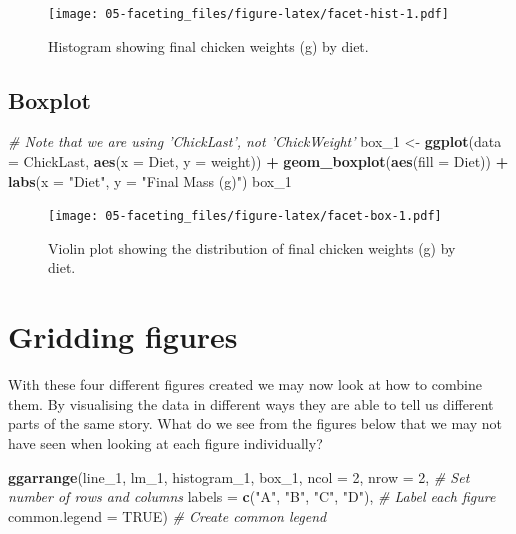 \documentclass[]{book}
\newenvironment{Shaded}{\begin{snugshade}}{\end{snugshade}}
\newcommand{\KeywordTok}[1]{\textcolor[rgb]{0.13,0.29,0.53}{\textbf{#1}}}
\newcommand{\DataTypeTok}[1]{\textcolor[rgb]{0.13,0.29,0.53}{#1}}
\newcommand{\DecValTok}[1]{\textcolor[rgb]{0.00,0.00,0.81}{#1}}
\newcommand{\StringTok}[1]{\textcolor[rgb]{0.31,0.60,0.02}{#1}}
\newcommand{\CommentTok}[1]{\textcolor[rgb]{0.56,0.35,0.01}{\textit{#1}}}
\newcommand{\OtherTok}[1]{\textcolor[rgb]{0.56,0.35,0.01}{#1}}
\newcommand{\OperatorTok}[1]{\textcolor[rgb]{0.81,0.36,0.00}{\textbf{#1}}}
\newcommand{\NormalTok}[1]{#1}
\theoremstyle{definition}
\theoremstyle{definition}
\theoremstyle{definition}
\theoremstyle{remark}
\begin{document}
\begin{figure}
\centering
\texttt{[image: 05-faceting\_files/figure-latex/facet-hist-1.pdf]}
\caption{\label{fig:facet-hist}Histogram showing final chicken weights (g)
by diet.}
\end{figure}

\subsection{Boxplot}\label{boxplot}

\begin{Shaded}
\begin{Highlighting}[]
\CommentTok{# Note that we are using 'ChickLast', not 'ChickWeight'}
\NormalTok{box_}\DecValTok{1}\NormalTok{ <-}\StringTok{ }\KeywordTok{ggplot}\NormalTok{(}\DataTypeTok{data =}\NormalTok{ ChickLast, }\KeywordTok{aes}\NormalTok{(}\DataTypeTok{x =}\NormalTok{ Diet, }\DataTypeTok{y =}\NormalTok{ weight)) }\OperatorTok{+}
\StringTok{  }\KeywordTok{geom_boxplot}\NormalTok{(}\KeywordTok{aes}\NormalTok{(}\DataTypeTok{fill =}\NormalTok{ Diet)) }\OperatorTok{+}
\StringTok{  }\KeywordTok{labs}\NormalTok{(}\DataTypeTok{x =} \StringTok{"Diet"}\NormalTok{, }\DataTypeTok{y =} \StringTok{"Final Mass (g)"}\NormalTok{)}
\NormalTok{box_}\DecValTok{1}
\end{Highlighting}
\end{Shaded}

\begin{figure}
\centering
\texttt{[image: 05-faceting\_files/figure-latex/facet-box-1.pdf]}
\caption{\label{fig:facet-box}Violin plot showing the distribution of final
chicken weights (g) by diet.}
\end{figure}

\section{Gridding figures}\label{gridding-figures}

With these four different figures created we may now look at how to
combine them. By visualising the data in different ways they are able to
tell us different parts of the same story. What do we see from the
figures below that we may not have seen when looking at each figure
individually?

\begin{Shaded}
\begin{Highlighting}[]
\KeywordTok{ggarrange}\NormalTok{(line_}\DecValTok{1}\NormalTok{, lm_}\DecValTok{1}\NormalTok{, histogram_}\DecValTok{1}\NormalTok{, box_}\DecValTok{1}\NormalTok{, }
          \DataTypeTok{ncol =} \DecValTok{2}\NormalTok{, }\DataTypeTok{nrow =} \DecValTok{2}\NormalTok{, }\CommentTok{# Set number of rows and columns}
          \DataTypeTok{labels =} \KeywordTok{c}\NormalTok{(}\StringTok{"A"}\NormalTok{, }\StringTok{"B"}\NormalTok{, }\StringTok{"C"}\NormalTok{, }\StringTok{"D"}\NormalTok{), }\CommentTok{# Label each figure}
          \DataTypeTok{common.legend =} \OtherTok{TRUE}\NormalTok{) }\CommentTok{# Create common legend}
\end{Highlighting}
\end{Shaded}
\end{document}
